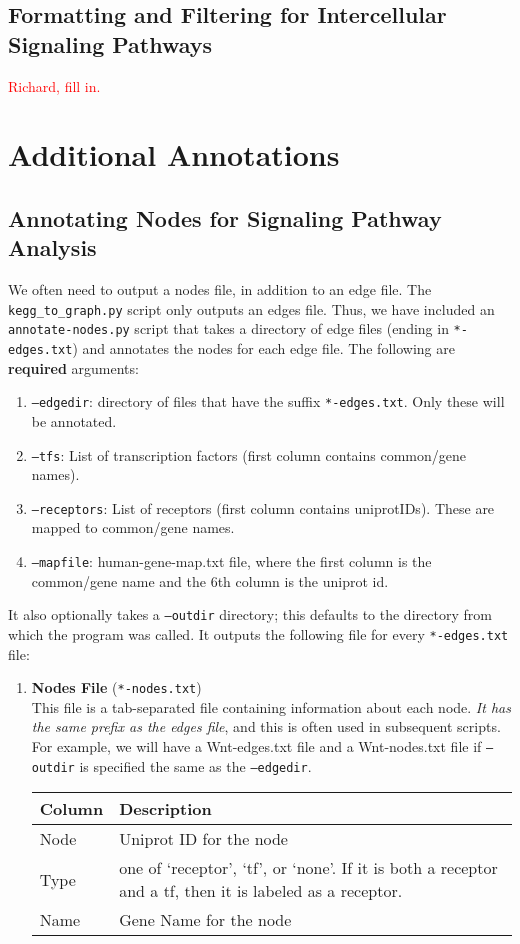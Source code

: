 \documentclass[10pt]{article}
\newcommand{\keggtograph}{\texttt{kegg\_to\_graph.py} }
\newcommand{\annotatenodes}{\texttt{annotate-nodes.py} }
\begin{document}
\subsection{Formatting and Filtering for Intercellular Signaling Pathways}

\textcolor{red}{Richard, fill in.}

\section{Additional Annotations}

\subsection{Annotating Nodes for Signaling Pathway Analysis}

We often need to output a nodes file, in addition to an edge file.  The \keggtograph script only outputs an edges file.  Thus, we have included an \annotatenodes script that takes a directory of edge files (ending in \texttt{*-edges.txt}) and annotates the nodes for each edge file.  The following are \textbf{required} arguments:
\begin{enumerate}
\item \texttt{--edgedir}: directory of files that have the suffix \texttt{*-edges.txt}. Only these will be annotated.
\item \texttt{--tfs}: List of transcription factors (first column contains common/gene names).  
\item \texttt{--receptors}: List of receptors (first column contains uniprotIDs). These are mapped to common/gene names.
\item \texttt{--mapfile}: human-gene-map.txt file, where the first column is the common/gene name and the 6th column is the uniprot id.
\end{enumerate}

It also optionally takes a \texttt{--outdir} directory; this defaults to the directory from which the program was called.  It outputs the following file for every \texttt{*-edges.txt} file:
\begin{enumerate}
\item \textbf{Nodes File} (\texttt{*-nodes.txt})\\
This file is a tab-separated file containing information about each node.  \emph{It has the same prefix as the edges file}, and this is often used in subsequent scripts.  For example, we will have a Wnt-edges.txt file and a Wnt-nodes.txt file if \texttt{--outdir} is specified the same as the \texttt{--edgedir}.
\begin{center}
\begin{tabular}{l|l}
\textbf{Column} & \textbf{Description} \\ \hline
Node & Uniprot ID for the node\\
Type & one of `receptor', `tf', or `none'. If it is both a receptor and a tf, then it is labeled as a receptor. \\
Name & Gene Name for the node
\end{tabular}
\end{center}
\end{enumerate}
\end{document}
